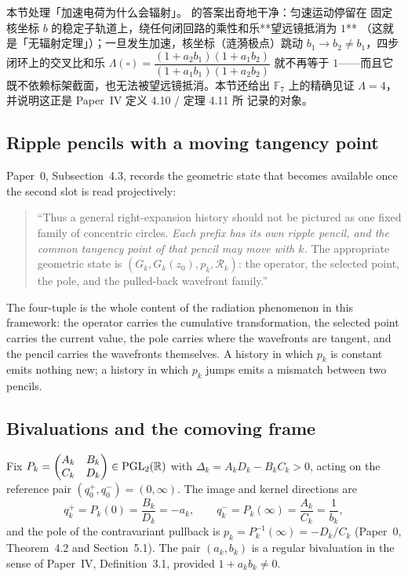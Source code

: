 
\begin{cnread}
本节处理「加速电荷为什么会辐射」。\AEG{} 的答案出奇地干净：匀速运动停留在
固定核坐标 $b$ 的稳定子轨道上，绕任何闭回路的乘性和乐**望远镜抵消为 $1$**
（这就是「无辐射定理」）；一旦发生加速，核坐标（涟漪极点）跳动
$b_1\to b_2\ne b_1$，四步闭环上的交叉比和乐
$\Lambda(\square)=\dfrac{(1+a_2b_1)(1+a_1b_2)}{(1+a_1b_1)(1+a_2b_2)}$ 就不再等于
$1$——而且它既不依赖标架截面，也无法被望远镜抵消。本节还给出 $\mathbb F_7$
上的精确见证 $\Lambda=4$，并说明这正是 Paper~IV 定义 4.10 / 定理 4.11 所
记录的对象。
\end{cnread}

\subsection{Ripple pencils with a moving tangency point}

Paper~0, Subsection~4.3, records the geometric state that becomes available once
the second slot is read projectively:

\begin{quote}\small
``Thus a general right-expansion history should not be pictured as one fixed
family of concentric circles.  \emph{Each prefix has its own ripple pencil, and
the common tangency point of that pencil may move with $k$.}  The appropriate
geometric state is $(G_k,G_k(z_0),p_k,\mathcal R_k)$: the operator, the selected
point, the pole, and the pulled-back wavefront family.''
\end{quote}

The four-tuple is the whole content of the radiation phenomenon in this
framework: the operator carries the cumulative transformation, the selected
point carries the current value, the pole carries where the wavefronts are
tangent, and the pencil carries the wavefronts themselves.  A history in which
$p_k$ is constant emits nothing new; a history in which $p_k$ jumps emits a
mismatch between two pencils.

\subsection{Bivaluations and the comoving frame}

Fix $P_k=\begin{pmatrix}A_k&B_k\\C_k&D_k\end{pmatrix}\in\operatorname{PGL}_2(\mathbb{R})$ with
$\Delta_k=A_kD_k-B_kC_k>0$, acting on the reference pair
$(q_0^+,q_0^-)=(0,\infty)$.  The image and kernel directions are
\begin{equation}\label{eq:bivaluation}
  q_k^+=P_k(0)=\frac{B_k}{D_k}=-a_k,
  \qquad
  q_k^-=P_k(\infty)=\frac{A_k}{C_k}=\frac1{b_k},
\end{equation}
and the pole of the contravariant pullback is
$p_k=P_k^{-1}(\infty)=-D_k/C_k$ (Paper~0, Theorem~4.2 and Section~5.1).  The
pair $(a_k,b_k)$ is a regular bivaluation in the sense of Paper~IV,
Definition~3.1, provided $1+a_kb_k\ne0$.


